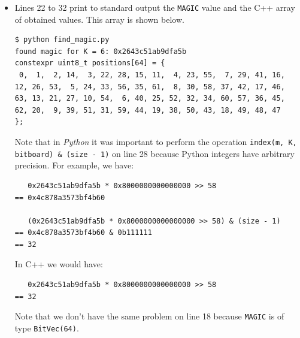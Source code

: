 \documentclass[12pt,a4paper,twoside,openright]{book}
\begin{document}
\begin{itemize}
\item Lines 22 to 32 print to standard output the \texttt{MAGIC} value and the C++ array of obtained values. This array is shown below. 

\begin{mdframed}[skipabove=\baselineskip,skipbelow=0pt,hidealllines=true,backgroundcolor=black!3,innerleftmargin=10pt,innerrightmargin=5pt,innertopmargin=0pt,innerbottommargin=5pt]
\begin{verbatim}
$ python find_magic.py
found magic for K = 6: 0x2643c51ab9dfa5b
constexpr uint8_t positions[64] = {
 0,  1,  2, 14,  3, 22, 28, 15, 11,  4, 23, 55,  7, 29, 41, 16,
12, 26, 53,  5, 24, 33, 56, 35, 61,  8, 30, 58, 37, 42, 17, 46,
63, 13, 21, 27, 10, 54,  6, 40, 25, 52, 32, 34, 60, 57, 36, 45,
62, 20,  9, 39, 51, 31, 59, 44, 19, 38, 50, 43, 18, 49, 48, 47
};
\end{verbatim}
\end{mdframed}


Note that in \emph{Python} it was important to perform the operation \texttt{index(m, K, bitboard) & (size - 1)} on line 28 because Python integers have arbitrary precision. For example, we have:

\begin{verbatim}
   0x2643c51ab9dfa5b * 0x8000000000000000 >> 58
== 0x4c878a3573bf4b60

   (0x2643c51ab9dfa5b * 0x8000000000000000 >> 58) & (size - 1)
== 0x4c878a3573bf4b60 & 0b111111
== 32
\end{verbatim}

In C++ we would have:

\begin{verbatim}
   0x2643c51ab9dfa5b * 0x8000000000000000 >> 58
== 32
\end{verbatim}

Note that we don't have the same problem on line 18 because \texttt{MAGIC} is of type \texttt{BitVec(64)}.\\

\end{itemize}
\end{document}
